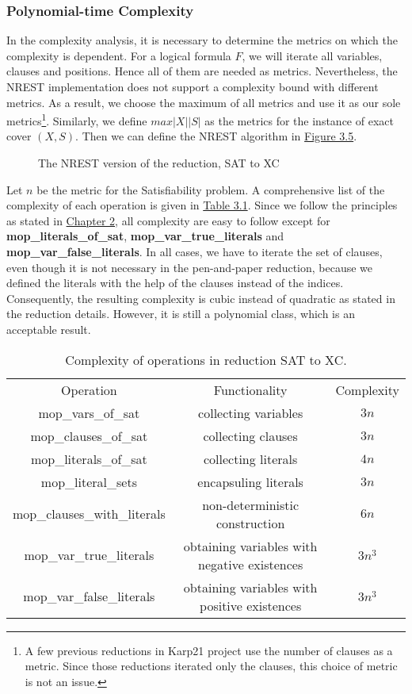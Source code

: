 \subsubsection{Polynomial-time Complexity}
In the complexity analysis, it is necessary to determine the metrics on which the complexity is dependent. For 
a logical formula $F$, we will iterate all variables, clauses and positions. Hence all of them are needed as metrics. 
Nevertheless, the NREST implementation does not support a complexity bound with different metrics. 
As a result, we choose the maximum of all metrics and use it as our sole metrics\footnote{A few previous reductions in Karp21 project use the number of clauses 
as a metric. Since those reductions iterated only the clauses, this choice of metric is not an issue.}. Similarly, we define $max |X| |S|$ as the metrics 
for the instance of exact cover  $(X, S)$. Then we can define the NREST algorithm in \hyperref[fig:3.5]{Figure 3.5}.
\begin{figure}[!h]
    \centering
    \caption{The NREST version of the reduction, SAT to XC}
    \label{fig:3.5}
\end{figure}
Let $n$ be the metric for the Satisfiability problem.
A comprehensive list of the complexity of each operation is given in \hyperref[table:3.1]{Table 3.1}. 
Since we follow the principles as stated in \hyperref[para1]{Chapter 2}, all complexity are easy to follow 
except for \textbf{mop\_literals\_of\_sat}, \textbf{mop\_var\_true\_literals} and \textbf{mop\_var\_false\_literals}. 
In all cases, we have to iterate the set of clauses, even though it is not necessary in the pen-and-paper reduction, 
because we defined the literals with the help of the clauses instead of the indices. Consequently, the resulting 
complexity is cubic instead of quadratic as stated in the reduction details. However, it is still 
a polynomial class, which is an acceptable result.
\begin{table}[!h]
    \centering 
    \begin{tabular}{| c | c | c |}
        \hline 
        Operation & Functionality & Complexity \\ 
        \hhline{|=|=|=|}
        mop\_vars\_of\_sat & collecting variables & $3n$ \\ 
        \hline 
        mop\_clauses\_of\_sat & collecting clauses & $3n$ \\ 
        \hline 
        mop\_literals\_of\_sat & collecting literals & $4n$ \\ 
        \hline 
        mop\_literal\_sets & encapsuling literals & $3n$ \\
        \hline 
        mop\_clauses\_with\_literals & non-deterministic construction & $6n$ \\ 
        \hline 
        mop\_var\_true\_literals & obtaining variables with negative existences & $3n^3$ \\ 
        \hline
        mop\_var\_false\_literals & obtaining variables with positive existences & $3n^3$ \\ 
        \hline
    \end{tabular}
    \caption{Complexity of operations in reduction SAT to XC.}
    \label{table:3.1}
\end{table}
